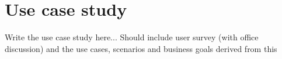 \chapter{Use case study}
\label{chp:use_case_study} 

Write the use case study here...
Should include user survey (with office discussion) and the use cases, scenarios and business goals derived from this
